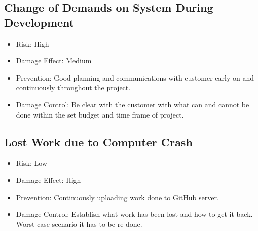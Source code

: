 \documentclass[a4paper]{article}
\begin{document}
\subsection{Change of Demands on System During Development}
\begin{itemize}
\item Risk: High
\item Damage Effect: Medium
\item Prevention: Good planning and communications with customer early on and continuously throughout the project.
\item Damage Control: Be clear with the customer with what can and cannot be done within the set budget and time frame of project.
\end{itemize}

\subsection{Lost Work due to Computer Crash}
\begin{itemize}
\item Risk: Low
\item Damage Effect: High
\item Prevention: Continuously uploading work done to GitHub server.
\item Damage Control: Establish what work has been lost and how to get it back. Worst case scenario it has to be re-done.
\end{itemize}
\end{document}
